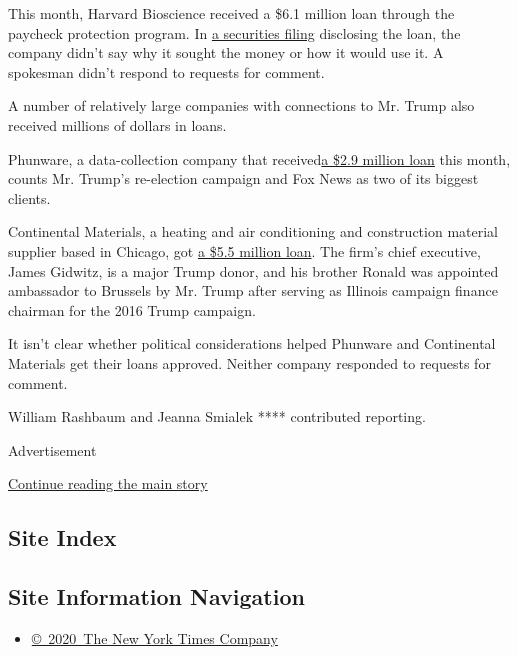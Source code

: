 This month, Harvard Bioscience received a \$6.1 million loan through the
paycheck protection program. In
\href{https://www.sec.gov/Archives/edgar/data/1123494/000117184320002798/f8k_042220.htm}{a
securities filing} disclosing the loan, the company didn't say why it
sought the money or how it would use it. A spokesman didn't respond to
requests for comment.

A number of relatively large companies with connections to Mr. Trump
also received millions of dollars in loans.

Phunware, a data-collection company that
received\href{https://investors.phunware.com/news-events/press-releases/detail/96/phunware-receives-united-states-small-business}{a
\$2.9 million loan} this month, counts Mr. Trump's re-election campaign
and Fox News as two of its biggest clients.

Continental Materials, a heating and air conditioning and construction
material supplier based in Chicago, got
\href{https://www.sec.gov/Archives/edgar/data/24104/000110465920048601/tm2016372-1_8k.htm}{a
\$5.5 million loan}. The firm's chief executive, James Gidwitz, is a
major Trump donor, and his brother Ronald was appointed ambassador to
Brussels by Mr. Trump after serving as Illinois campaign finance
chairman for the 2016 Trump campaign.

It isn't clear whether political considerations helped Phunware and
Continental Materials get their loans approved. Neither company
responded to requests for comment.

William Rashbaum and Jeanna Smialek **** contributed reporting.

Advertisement

\protect\hyperlink{after-bottom}{Continue reading the main story}

\hypertarget{site-index}{%
\subsection{Site Index}\label{site-index}}

\hypertarget{site-information-navigation}{%
\subsection{Site Information
Navigation}\label{site-information-navigation}}

\begin{itemize}
\tightlist
\item
  \href{https://help.nytimes3xbfgragh.onion/hc/en-us/articles/115014792127-Copyright-notice}{©~2020~The
  New York Times Company}
\end{itemize}

